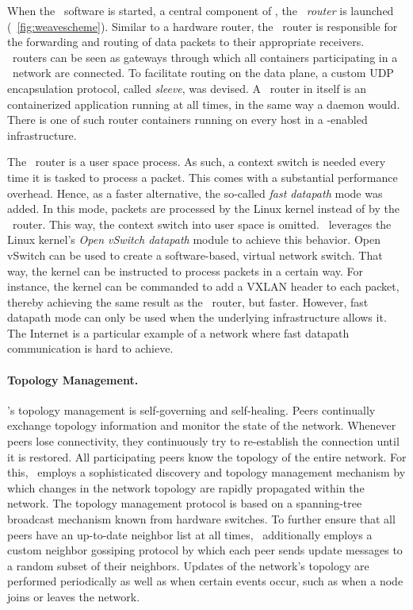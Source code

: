 When the \weave\ software is started, a central component of \wnet , the \emph{\weave\ router} is launched (\cf\ \autoref{fig:weavescheme}). Similar to a hardware router, the \weave\ router is responsible for the forwarding and routing of data packets to their appropriate receivers. \weave\ routers can be seen as gateways through which all containers participating in a \weave\ network are connected. To facilitate routing on the data plane, a custom UDP encapsulation protocol, called \emph{sleeve}, was devised. A \weave\ router in itself is an containerized application running at all times, in the same way a daemon would. There is one of such router containers running on every host in a \weave -enabled infrastructure.

The \weave\ router is a user space process. As such, a context switch is needed every time it is tasked to process a packet. This comes with a substantial performance overhead. Hence, as a faster alternative, the so-called \emph{fast datapath} mode was added. In this mode, packets are processed by the Linux kernel instead of by the \weave\ router. This way, the context switch into user space is omitted. \wnet\ leverages the Linux kernel's \emph{Open vSwitch datapath} module \cite{pfaff2015design} to achieve this behavior. Open vSwitch can be used to create a software-based, virtual network switch. That way, the kernel can be instructed to process packets in a certain way. For instance, the kernel can be commanded to add a VXLAN header to each packet, thereby achieving the same result as the \weave\ router, but faster. However, fast datapath mode can only be used when the underlying infrastructure allows it. The Internet is a particular example of a network where fast datapath communication is hard to achieve.


\paragraph{Topology Management.} 
\weave 's topology management is self-governing and self-healing. Peers continually exchange topology information and monitor the state of the network. Whenever peers lose connectivity, they continuously try to re-establish the connection until it is restored. All participating peers know the topology of the entire network. For this, \wnet\ employs a sophisticated discovery and topology management mechanism by which changes in the network topology are rapidly propagated within the network. The topology management protocol is based on a spanning-tree broadcast mechanism known from hardware switches. To further ensure that all peers have an up-to-date neighbor list at all times, \wnet\ additionally employs a custom neighbor gossiping protocol by which each peer sends update messages to a random subset of their neighbors. Updates of the network's topology are performed periodically as well as when certain events occur, such as when a node joins or leaves the network.

